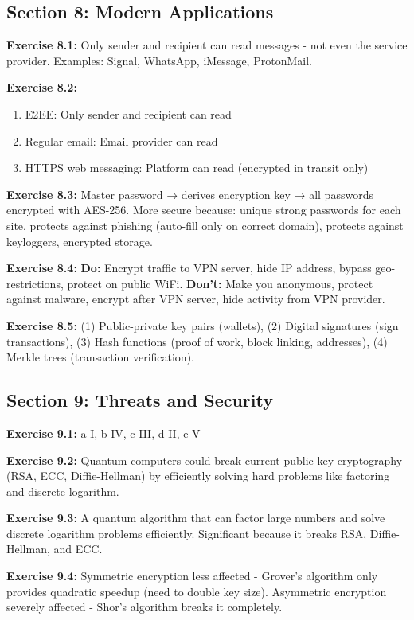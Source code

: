 \documentclass[11pt,a4paper]{report}
\begin{document}
\subsection*{Section 8: Modern Applications}

\textbf{Exercise 8.1:}
Only sender and recipient can read messages - not even the service provider. Examples: Signal, WhatsApp, iMessage, ProtonMail.

\textbf{Exercise 8.2:}
\begin{enumerate}[label=\alph*)]
    \item E2EE: Only sender and recipient can read
    \item Regular email: Email provider can read
    \item HTTPS web messaging: Platform can read (encrypted in transit only)
\end{enumerate}

\textbf{Exercise 8.3:}
Master password → derives encryption key → all passwords encrypted with AES-256. More secure because: unique strong passwords for each site, protects against phishing (auto-fill only on correct domain), protects against keyloggers, encrypted storage.

\textbf{Exercise 8.4:}
\textbf{Do:} Encrypt traffic to VPN server, hide IP address, bypass geo-restrictions, protect on public WiFi. \textbf{Don't:} Make you anonymous, protect against malware, encrypt after VPN server, hide activity from VPN provider.

\textbf{Exercise 8.5:}
(1) Public-private key pairs (wallets), (2) Digital signatures (sign transactions), (3) Hash functions (proof of work, block linking, addresses), (4) Merkle trees (transaction verification).

\subsection*{Section 9: Threats and Security}

\textbf{Exercise 9.1:}
a-I, b-IV, c-III, d-II, e-V

\textbf{Exercise 9.2:}
Quantum computers could break current public-key cryptography (RSA, ECC, Diffie-Hellman) by efficiently solving hard problems like factoring and discrete logarithm.

\textbf{Exercise 9.3:}
A quantum algorithm that can factor large numbers and solve discrete logarithm problems efficiently. Significant because it breaks RSA, Diffie-Hellman, and ECC.

\textbf{Exercise 9.4:}
Symmetric encryption less affected - Grover's algorithm only provides quadratic speedup (need to double key size). Asymmetric encryption severely affected - Shor's algorithm breaks it completely.
\end{document}
